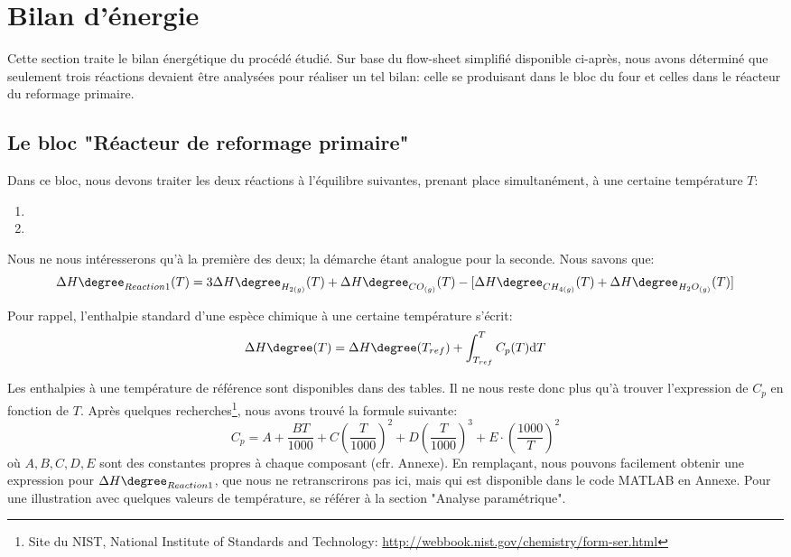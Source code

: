 \documentclass[11pt,a4paper]{report}
\author{Groupe 1246}
\begin{document}
\section*{Bilan d'énergie}

Cette section traite le bilan énergétique du procédé étudié.
Sur base du flow-sheet simplifié disponible ci-après, nous avons déterminé que seulement trois réactions
devaient être analysées pour réaliser un tel bilan: celle se produisant dans le bloc du four et celles dans 
le réacteur du reformage primaire.

\subsection*{Le bloc "Réacteur de reformage primaire"}

Dans ce bloc, nous devons traiter les deux réactions à l'équilibre suivantes, prenant
place simultanément, à une certaine température $T$:

\begin{enumerate}
\item {}
\item {}
\end{enumerate}

\bigbreak
Nous ne nous intéresserons qu'à la première des deux; la démarche étant analogue pour la seconde. Nous savons que:
$$\Delta H\degree_{Reaction1}(T)=3\Delta H\degree_{H_{2(g)}}(T) + \Delta H\degree_{CO_{(g)}}(T) -
\lbrack\Delta H\degree_{CH_{4(g)}}(T) + \Delta H\degree_{H_{2}O_{(g)}}(T)\rbrack$$

Pour rappel, l'enthalpie standard d'une espèce chimique à une certaine température s'écrit: 
$$\Delta H\degree(T)=\Delta H\degree(T_{ref})  + \displaystyle \int_{T_{ref}}^{T} C_{p}(T) \mathrm{d}T$$

Les enthalpies à une température de référence sont disponibles dans des tables. Il ne nous reste donc plus
qu'à trouver l'expression de $C_p$ en fonction de $T$.
Après quelques recherches\footnote{Site du \textsc{NIST}, National Institute of Standards and Technology:
\url{http://webbook.nist.gov/chemistry/form-ser.html}}, nous avons trouvé la formule suivante:
$$C_p=A+\dfrac{BT}{1000}+C\left(\dfrac{T}{1000}\right)^2+D\left(\dfrac{T}{1000}\right)^3+
E\cdot\left(\dfrac{1000}{T}\right)^2$$
où $A,B,C,D,E$ sont des constantes propres à chaque composant (cfr. Annexe).
En remplaçant, nous pouvons facilement obtenir une expression pour $\Delta H\degree_{Reaction1}$, que nous ne retranscrirons pas
ici, mais qui est disponible dans le code \textsc{MATLAB} en Annexe. Pour une illustration avec quelques valeurs de 
température, se référer à la section "Analyse paramétrique".
\end{document}
